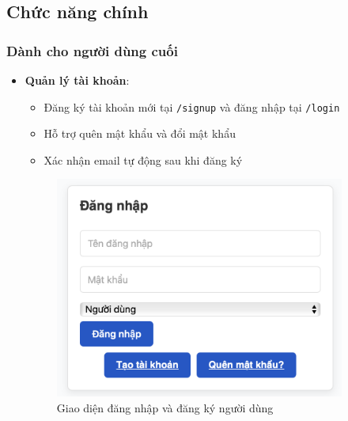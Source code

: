 \documentclass[12pt,a4paper]{article}
\begin{document}
\subsection{Chức năng chính}

\subsubsection{Dành cho người dùng cuối}
\begin{itemize}[leftmargin=1cm]
    \item \textbf{Quản lý tài khoản}:
        \begin{itemize}[leftmargin=0.5cm]
            \item Đăng ký tài khoản mới tại \texttt{/signup} và đăng nhập tại \texttt{/login}
            \item Hỗ trợ quên mật khẩu và đổi mật khẩu
            \item Xác nhận email tự động sau khi đăng ký
        \end{itemize}
\begin{figure}[H]
    \centering
    \includegraphics[width=0.9\textwidth]{ui_user_dang_nhap_dang_ky.png} %
    \caption{Giao diện đăng nhập và đăng ký người dùng}
    \label{fig:ui_user_login_signup}
\end{figure}


\end{itemize}
\end{document}
